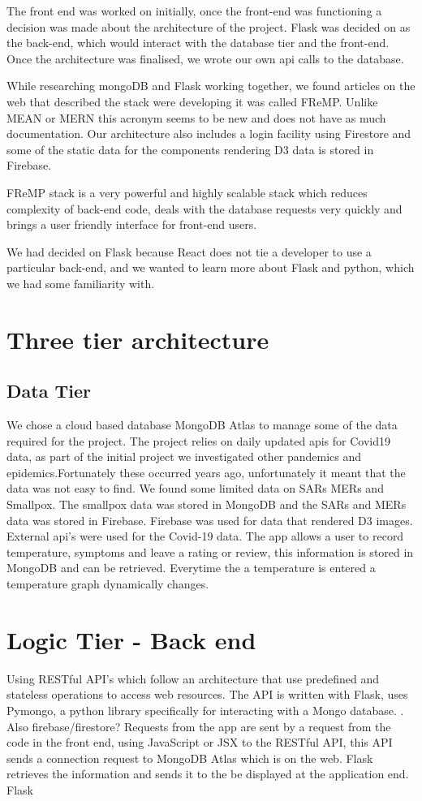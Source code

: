 The front end was worked on initially, once the front-end was functioning a decision was made about the architecture of the project. Flask was decided on as the back-end, which would interact with the database tier and the front-end.
Once the architecture was finalised, we wrote our own api calls to the database.


While researching mongoDB and Flask working together, we found articles on the web that described the stack were developing it was called FReMP. Unlike MEAN or MERN this acronym seems to be new and does not have as much documentation. Our architecture also includes a login facility using Firestore and some of the static data for the components rendering D3 data is stored in Firebase.

FReMP stack is a very powerful and highly scalable stack which reduces complexity of back-end code, deals with the database requests very quickly and brings a user friendly interface for front-end users.

We had decided on Flask because React does not tie a developer to use a particular back-end, and we wanted to learn more about Flask and python, which we had some familiarity with.



\section{Three tier architecture}
\subsection{Data Tier}
We chose a cloud based database MongoDB Atlas to manage some of the data required for the project. The project relies on daily updated apis for Covid19 data, as part of the initial project we investigated other pandemics and epidemics.Fortunately these occurred years ago, unfortunately it meant that the data was not easy to find. We found some limited data on SARs MERs and Smallpox. The smallpox data was stored in MongoDB and the SARs and MERs data was stored in Firebase.
Firebase was used for data that rendered D3 images. External api's were used for the Covid-19 data. The app allows a user to record temperature, symptoms and leave a rating or review, this information is stored in MongoDB and can be retrieved. Everytime the a temperature is entered a temperature graph dynamically changes.

\section{Logic Tier - Back end}
Using RESTful API's which follow an architecture that use predefined and stateless operations to access web resources.
The API is written with Flask, uses Pymongo, a python library specifically for interacting with a Mongo database. . Also firebase/firestore?
Requests from the app are sent by a request from the code in the front end, using JavaScript or JSX to the RESTful API, this API sends a connection request to MongoDB Atlas which is on the web. Flask retrieves the information and sends it to the be displayed at the application end.
Flask

